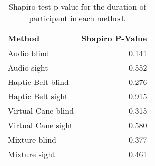 
\begin{table}[!htb]
\centering
\caption{Shapiro test p-value for the duration of participant in each method.}
\label{tab:shapiro_duration}
\begin{tabular}{lr}
\toprule
            Method &  Shapiro P-Value \\
\midrule
       Audio blind &            0.141 \\
       Audio sight &            0.552 \\
 Haptic Belt blind &            0.276 \\
 Haptic Belt sight &            0.915 \\
Virtual Cane blind &            0.315 \\
Virtual Cane sight &            0.580 \\
     Mixture blind &            0.377 \\
     Mixture sight &            0.461 \\
\bottomrule
\end{tabular}
\end{table}

